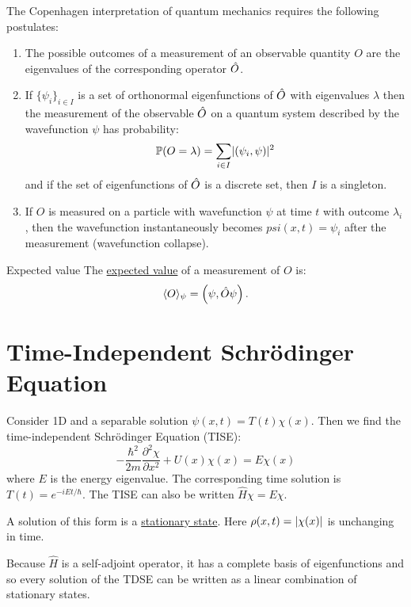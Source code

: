 \documentclass[../Main.tex]{subfiles}
\begin{document}
The Copenhagen interpretation of quantum mechanics requires the following postulates:
\begin{enumerate}
    \item The possible outcomes of a measurement of an observable quantity $O$ are the eigenvalues of the corresponding operator $\hat{O}$.
    \item If $\{\psi_i\}_{i \in I}$ is a set of orthonormal eigenfunctions of $\hat{O}$ with eigenvalues $\lambda$ then the measurement of the observable $\hat{O}$ on a quantum system described by the wavefunction $\psi$ has probability:
        \begin{equation*}
            \mathbb{P}(O = \lambda) = \sum_{i \in I}\lvert\left(\psi_i,\psi\right)\rvert^2
        \end{equation*}
        and if the set of eigenfunctions of $\hat{O}$ is a discrete set, then $I$ is a singleton.
    \item If $O$ is measured on a particle with wavefunction $\psi$ at time $t$ with outcome $\lambda_i$, then the wavefunction instantaneously becomes $psi(x, t) = \psi_i$ after the measurement (wavefunction collapse).
\end{enumerate}
\begin{definition}{Expected value}
    The \underline{expected value} of a measurement of $O$ is:
    \begin{equation*}
        \langle O \rangle_\psi = \left(\psi,\hat{O} \psi\right).
    \end{equation*}
\end{definition}
\section{Time-Independent Schr\"odinger Equation}
Consider 1D and a separable solution $\psi(x, t) = T(t) \chi(x)$. Then we find the time-independent Schr\"odinger Equation (TISE):
\begin{equation}
    -\frac{\hbar^2}{2m} \frac{\partial^{2}\chi}{\partial x^{2}} + U(x) \chi(x) = E\chi(x)
    \label{eqnTISE}
\end{equation}
where $E$ is the energy eigenvalue. The corresponding time solution is $T(t) = e^{-iEt/\hbar}$. The TISE can also be written $\hat{H}\chi = E\chi$.

A solution of this form is a \underline{stationary state}. Here $\rho(x, t) = \lvert\chi(x)\rvert$ is unchanging in time.

Because $\hat{H}$ is a self-adjoint operator, it has a complete basis of eigenfunctions and so every solution of the TDSE can be written as a linear combination of stationary states.
\end{document}
